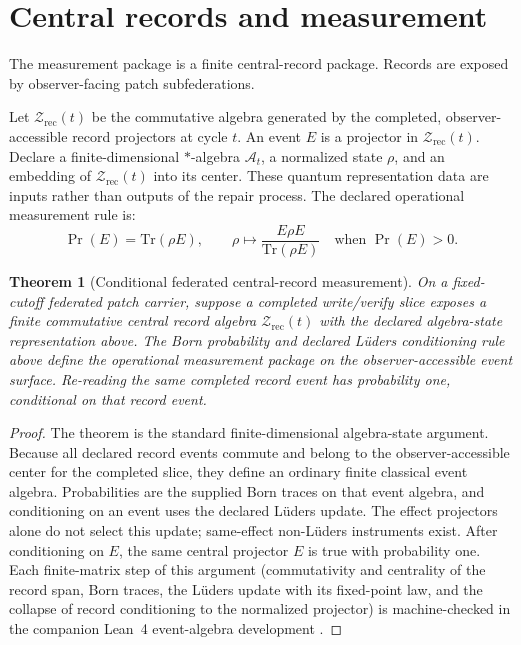 \documentclass[11pt]{article}
\newtheorem{theorem}{Theorem}[section]
\theoremstyle{remark}
\theoremstyle{plain}
\begin{document}
\section{Central records and measurement}
\label{sec:central-records}

The measurement package is a finite central-record package. Records are exposed by
observer-facing patch subfederations.

Let \(\mathcal Z_{\mathrm{rec}}(t)\) be the commutative algebra generated by the completed,
observer-accessible record projectors at cycle \(t\). An event \(E\) is a projector in
\(\mathcal Z_{\mathrm{rec}}(t)\). Declare a finite-dimensional
\(*\)-algebra \(\mathcal A_t\), a normalized state \(\rho\), and an embedding
of \(\mathcal Z_{\mathrm{rec}}(t)\) into its center. These quantum
representation data are inputs rather than outputs of the repair process.
The declared operational measurement rule is:
\[
\Pr(E)=\mathrm{Tr}(\rho E),
\qquad
\rho\mapsto \frac{E\rho E}{\mathrm{Tr}(\rho E)}
\quad\text{when }\Pr(E)>0.
\]

\begin{theorem}[Conditional federated central-record measurement]
On a fixed-cutoff federated patch carrier, suppose a completed write/verify slice exposes a finite
commutative central record algebra \(\mathcal Z_{\mathrm{rec}}(t)\) with the
declared algebra-state representation above. The Born probability and
declared L\"uders conditioning rule above define the operational measurement package on the
observer-accessible event surface. Re-reading the same completed record event has probability
one, conditional on that record event.
\end{theorem}

\begin{proof}
The theorem is the standard finite-dimensional algebra-state argument. Because all declared
record events commute and belong to the observer-accessible center for the completed slice, they
define an ordinary finite classical event algebra. Probabilities are the supplied Born traces on that event
algebra, and conditioning on an event uses the declared L\"uders update. The
effect projectors alone do not select this update; same-effect non-L\"uders
instruments exist. After conditioning on \(E\), the
same central projector \(E\) is true with probability one. Each finite-matrix step of this
argument (commutativity and centrality of the record span, Born traces, the L\"uders update with
its fixed-point law, and the collapse of record conditioning to the normalized projector) is
machine-checked in the companion Lean~4 event-algebra development \cite{eventalgebraLean}.
\end{proof}
\end{document}
